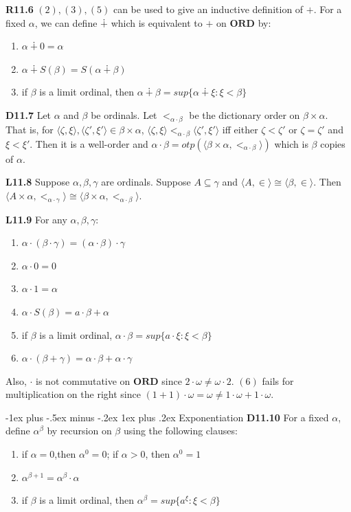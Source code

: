\documentclass[10pt, landscape]{article}
\makeatletter
\renewcommand{\subsection}{\@startsection{subsection}{3}{0mm}%
                                {-1ex plus -.5ex minus -.2ex}%
                                {1ex plus .2ex}%
                                {\normalfont\small\bfseries}}%
\makeatother
\begin{document}
\begin{multicols*}{3}
\textbf{R11.6} $(2), (3), (5)$ can be used to give an inductive definition of $+$. For a fixed $\alpha$, we can define $\dotplus$ which is equivalent to $+$ on $\mathbf{ORD}$ by:
\begin{enumerate}
    \item $\alpha\dotplus 0 = \alpha$
    \item $\alpha \dotplus S(\beta)=S(\alpha\dotplus\beta)$
    \item if $\beta$ is a limit ordinal, then $\alpha\dotplus\beta=sup\{\alpha\dotplus\xi:\xi<\beta\}$
\end{enumerate}

\textbf{D11.7} Let $\alpha$ and $\beta$ be ordinals. Let $<_{\alpha\cdot\beta}$ be the dictionary order on $\beta\times \alpha$. That is, for $\langle\zeta, \xi\rangle, \langle \zeta', \xi'\rangle\in\beta \times \alpha$, $\langle \zeta, \xi\rangle <_{\alpha\cdot\beta} \langle\zeta', \xi'\rangle$ iff either $\zeta<\zeta'$ or $\zeta=\zeta'$ and $\xi<\xi'$. Then it is a well-order and $\alpha\cdot\beta=otp(\langle \beta \times \alpha, <_{\alpha\cdot\beta}\rangle)$ which is $\beta$ copies of $\alpha$.

\textbf{L11.8} Suppose $\alpha, \beta, \gamma$ are ordinals. Suppose $A\subseteq\gamma$ and $\langle A, \in \rangle\cong\langle\beta,\in\rangle$. Then $\langle A\times \alpha, <_{\alpha\cdot\gamma}\rangle\cong\langle \beta \times\alpha, <_{\alpha\cdot\beta}\rangle$.

\textbf{L11.9} For any $\alpha, \beta, \gamma$:
\begin{enumerate}
    \item $\alpha \cdot (\beta \cdot \gamma)=(\alpha \cdot \beta)\cdot \gamma$
    \item $\alpha \cdot 0=0$
    \item $\alpha \cdot 1=\alpha$
    \item $\alpha \cdot S(\beta)=a\cdot\beta+\alpha$
    \item if $\beta$ is a limit ordinal, $\alpha\cdot\beta=sup\{a\cdot\xi:\xi<\beta\}$
    \item $\alpha \cdot(\beta+\gamma)=\alpha\cdot\beta+\alpha\cdot\gamma$
\end{enumerate}
Also, $\cdot$ is not commutative on $\mathbf{ORD}$ since $2\cdot \omega\neq\omega\cdot2$. $(6)$ fails for multiplication on the right since $(1+1)\cdot\omega=\omega\neq 1\cdot \omega+1\cdot\omega$.

\subsection{Exponentiation}
\textbf{D11.10} For a fixed $\alpha$, define $\alpha^\beta$ by recursion on $\beta$ using the following clauses:
\begin{enumerate}
    \item if $\alpha=0$,then $\alpha^0=0$; if $\alpha>0$, then $\alpha^0=1$
    \item $\alpha^{\beta+1}=\alpha^\beta\cdot\alpha$
    \item if $\beta$ is a limit ordinal, then $\alpha^\beta=sup\{a^\xi:\xi<\beta\}$
\end{enumerate}


\end{multicols*}
\end{document}
